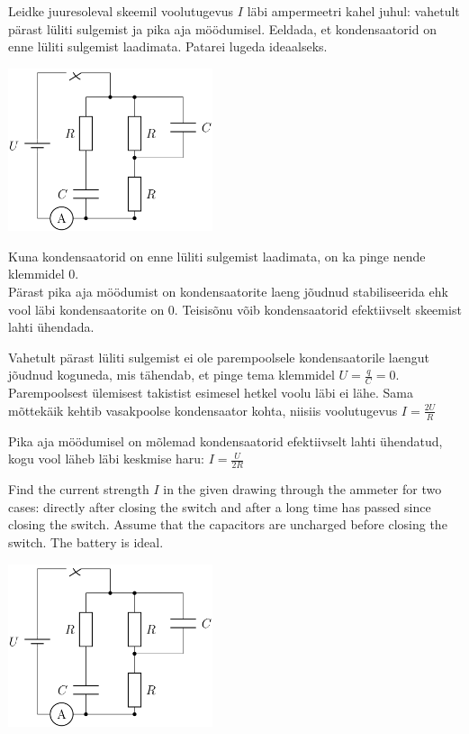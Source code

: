 
Leidke juuresoleval skeemil voolutugevus $I$ läbi ampermeetri kahel juhul: vahetult pärast lüliti sulgemist ja pika aja möödumisel. Eeldada, et kondensaatorid on enne lüliti sulgemist laadimata. Patarei lugeda ideaalseks.
\begin{center}
\includegraphics[width=0.45\textwidth]{2016-lahg-03-skeemjoonis.png}
\end{center}

\hint
Kuna kondensaatorid on enne lüliti sulgemist laadimata, on ka pinge nende klemmidel $0$.\\
Pärast pika aja möödumist on kondensaatorite laeng jõudnud stabiliseerida ehk vool läbi kondensaatorite on $0$. Teisisõnu võib kondensaatorid efektiivselt skeemist lahti ühendada.

\solu
Vahetult pärast lüliti sulgemist ei ole parempoolsele kondensaatorile laengut jõudnud koguneda, mis tähendab, et pinge tema klemmidel $U=\frac{q}{C}=0$. Parempoolsest ülemisest takistist esimesel hetkel voolu läbi ei lähe. Sama mõttekäik kehtib vasakpoolse kondensaator kohta, niisiis voolutugevus $I=\frac{2U}{R}$ 

Pika aja möödumisel on mõlemad kondensaatorid efektiivselt lahti ühendatud, kogu vool läheb läbi keskmise haru: $I=\frac{U}{2R}$

Find the current strength $I$ in the given drawing through the ammeter for two cases: directly after closing the switch and after a long time has passed since closing the switch. Assume that the capacitors are uncharged before closing the switch. The battery is ideal. 
\begin{center}
\includegraphics[width=0.45\textwidth]{2016-lahg-03-skeemjoonis}
\end{center}

